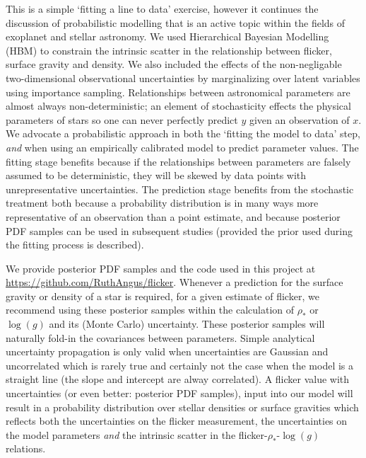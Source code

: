 \documentclass[apjl]{emulateapj}
\begin{document}
This is a simple `fitting a line to data' exercise, however it continues the
discussion of probabilistic modelling that is an active topic within the
fields of exoplanet and stellar astronomy.
We used Hierarchical Bayesian Modelling (HBM) to constrain the intrinsic
scatter in the relationship between flicker, surface gravity and density.
We also included the effects of the non-negligable two-dimensional observational
uncertainties by marginalizing over latent variables using importance sampling.
Relationships between astronomical parameters are almost always
non-deterministic; an element of stochasticity effects the physical parameters
of stars so one can never perfectly predict $y$ given an observation of $x$.
We advocate a probabilistic approach in both the `fitting the model to data'
step, {\it and} when using an empirically calibrated model to predict
parameter values.
The fitting stage benefits because if the relationships between parameters are
falsely assumed to be deterministic, they will be skewed by data points with
unrepresentative uncertainties.
The prediction stage benefits from the stochastic treatment both because a
probability distribution is in many ways more representative of an observation
than a point estimate, and because posterior PDF samples can be used in
subsequent studies (provided the prior used during the fitting process is
described).

We provide posterior PDF samples and the code used in this project at
\url{https://github.com/RuthAngus/flicker}.
Whenever a prediction for the surface gravity or density of a star is required,
for a given estimate of flicker, we recommend using these posterior samples
within the calculation of $\rho_{*}$ or $\log(g)$ and its (Monte Carlo)
uncertainty.
These posterior samples will naturally fold-in the covariances between
parameters.
Simple analytical uncertainty propagation is only valid when uncertainties are
Gaussian and uncorrelated which is rarely true and certainly not the case when
the model is a straight line (the slope and intercept are alway correlated).
A flicker value with uncertainties (or even better: posterior PDF
samples), input into our model will result in a probability distribution over
stellar densities or surface gravities which reflects both the uncertainties
on the flicker measurement, the uncertainties on the model parameters {\it and}
the intrinsic scatter in the flicker-$\rho_{*}$-$\log(g)$ relations.
\end{document}
